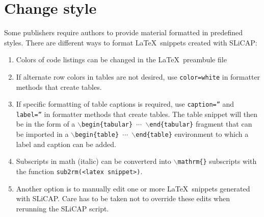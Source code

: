 \documentclass[a4paper,12pt]{article}
\begin{document}


\section{Change style}

Some publishers require authors to provide material formatted in predefined styles. There are different ways to format \LaTeX$\,$ snippets created with SLiCAP:

\begin{enumerate}
 \item Colors of code listings can be changed in the \LaTeX$\,$ preambule file
 \item If alternate row colors in tables are not desired, use {\texttt{color=white}} in formatter methods that create tables.
 \item If specific formatting of table captions is required, use {\texttt{caption=''}} and {\texttt{label=''}} in formatter methods that create tables. The table snippet will then be in the form of a {\texttt{$\backslash$begin\{tabular\} $\cdots$ $\backslash$end\{tabular\}}} fragment that can be imported
 in a {\texttt{$\backslash$begin\{table\} $\cdots$ $\backslash$end\{table\}}} environment to which a label and caption can be added.
 \item Subscripts in math (italic) can be converterd into {\texttt{$\backslash$mathrm\{\}}} subscripts with the function {\texttt{sub2rm(<latex snippet>)}}.

 

 \item Another option is to manually edit one or more \LaTeX$\,$ snippets generated with SLiCAP. Care has to be taken not to override these edits when rerunning the SLiCAP script.

\end{enumerate}
\end{document}
